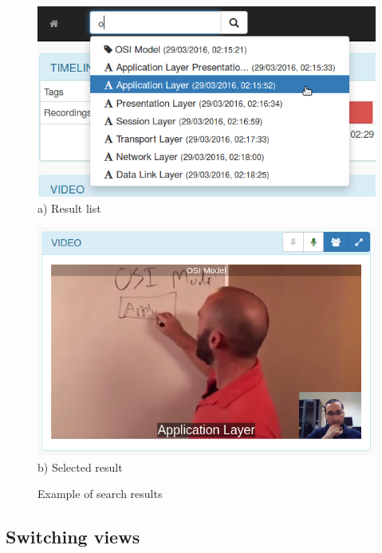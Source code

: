 \begin{figure}[!htb]
\centering
\begin{minipage}[b]{0.55\linewidth}
\centering

		\includegraphics[width=\textwidth]{figures/search.png}
	      a) Result list
\label{fig:minipage1}
\end{minipage}
\quad
\begin{minipage}[b]{0.40\linewidth}
		\centering

		\includegraphics[width=\textwidth]{figures/search2.png}
	       b) Selected result
\label{fig:minipage2}
\end{minipage}

		\caption{Example of search results}
		\label{fig:search}
\end{figure}


	\subsection{Switching views}

